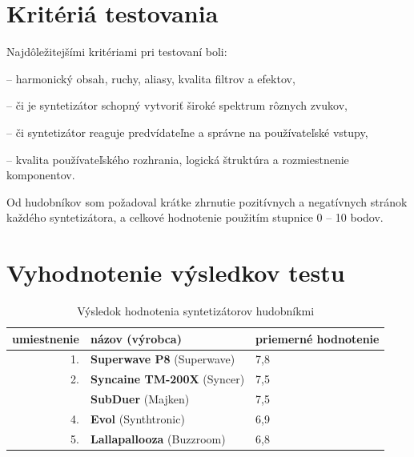 \section{Kritériá testovania}

Najdôležitejšími kritériami pri testovaní boli:

\begin{description}
\setlength{\itemsep}{-0.5ex}
\item[Kvalita zvuku] -- harmonický obsah, ruchy, aliasy, kvalita filtrov a efektov,
\item[Rozsiahlosť možností] -- či je syntetizátor schopný vytvoriť široké spektrum rôznych zvukov,
\item[Ovládanie a intuitívnosť] -- či syntetizátor reaguje predvídateľne a správne na používateľské vstupy,
\item[GUI a prehľadnosť] -- kvalita používateľského rozhrania, logická štruktúra a rozmiestnenie komponentov.
\end{description}

Od hudobníkov som požadoval krátke zhrnutie pozitívnych a negatívnych stránok každého syntetizátora, a celkové hodnotenie použitím stupnice 0 -- 10 bodov.

\section{Vyhodnotenie výsledkov testu}


\begin{table}[h]
\centering
\begin{tabular}{|r|l|l|}
\hline
umiestnenie & názov (výrobca) & priemerné hodnotenie\\
\hline \hline
1. & \textbf{Superwave P8} (Superwave) & 7,8\\
\hline 
2. & \textbf{Syncaine TM-200X} (Syncer) & 7,5\\
 & \textbf{SubDuer} (Majken) & 7,5\\
\hline 
4. & \textbf{Evol} (Synthtronic) & 6,9\\
\hline 
5. & \textbf{Lallapallooza} (Buzzroom) & 6,8\\
\hline
\end{tabular}
\caption{Výsledok hodnotenia syntetizátorov hudobníkmi}
\label{tab01}
\end{table}
\vspace{10 mm}



